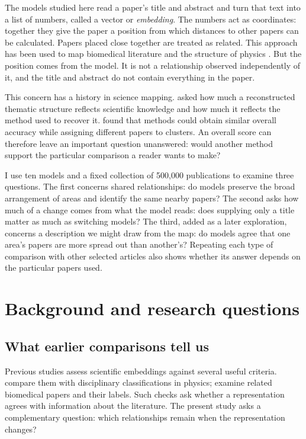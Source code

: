 \documentclass[12pt]{article}
\begin{document}
The models studied here read a paper's title and abstract and turn that text into a list of numbers, called a vector or \emph{embedding}. The numbers act as coordinates: together they give the paper a position from which distances to other papers can be calculated. Papers placed close together are treated as related. This approach has been used to map biomedical literature and the structure of physics \citep{refbe130e2973,refc0e2cc29e0}. But the position comes from the model. It is not a relationship observed independently of it, and the title and abstract do not contain everything in the paper.

This concern has a history in science mapping. \citet{refa0d2d707e6} asked how much a reconstructed thematic structure reflects scientific knowledge and how much it reflects the method used to recover it. \citet{ref6a2f5912bc} found that methods could obtain similar overall accuracy while assigning different papers to clusters. An overall score can therefore leave an important question unanswered: would another method support the particular comparison a reader wants to make?

I use ten models and a fixed collection of 500,000 publications to examine three questions. The first concerns shared relationships: do models preserve the broad arrangement of areas and identify the same nearby papers? The second asks how much of a change comes from what the model reads: does supplying only a title matter as much as switching models? The third, added as a later exploration, concerns a description we might draw from the map: do models agree that one area's papers are more spread out than another's? Repeating each type of comparison with other selected articles also shows whether its answer depends on the particular papers used.

\section{Background and research questions}
\subsection{What earlier comparisons tell us}
Previous studies assess scientific embeddings against several useful criteria. \citet{refc0e2cc29e0} compare them with disciplinary classifications in physics; \citet{refbe130e2973} examine related biomedical papers and their labels. Such checks ask whether a representation agrees with information about the literature. The present study asks a complementary question: which relationships remain when the representation changes?
\end{document}

